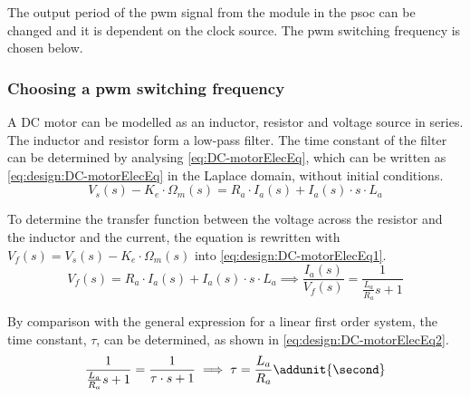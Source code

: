 The output period of the \gls{pwm} signal from the module in the \gls{psoc} can be changed and it is dependent on the clock source. The \gls{pwm} switching frequency is chosen below.

\subsubsection{Choosing a \gls{pwm} switching frequency}
A DC motor can be modelled as an inductor, resistor and voltage source in series. The inductor and resistor form a low-pass filter. The time constant of the filter can be determined by analysing \autoref{eq:DC-motorElecEq}, which can be written as \autoref{eq:design:DC-motorElecEq} in the Laplace domain, without initial conditions.
\begin{equation}
V_{s}(s)-K_{e}\cdot\Omega_{m}(s) = R_{a}\cdot I_a(s) + I_a(s)\cdot s\cdot L_a \label{eq:design:DC-motorElecEq}
\end{equation}
\startexplain
{}
\stopexplain

To determine the transfer function between the voltage across the resistor and the inductor and the current, the equation is rewritten with $V_f(s) = V_{s}(s)-K_{e}\cdot\Omega_{m}(s)$ into \autoref{eq:design:DC-motorElecEq1}.
\begin{equation}
V_f(s)= R_{a}\cdot I_a(s)+ I_a(s)\cdot s\cdot L_a  \implies \frac{I_a(s)}{V_f(s)}=\frac{1}{\frac{L_a}{R_a}s + 1} \label{eq:design:DC-motorElecEq1}
\end{equation}
\startexplain
{}
\stopexplain

By comparison with the general expression for a linear first order system, the time constant, $\tau$, can be determined, as shown in \autoref{eq:design:DC-motorElecEq2}.
\begin{equation}
\frac{1}{\frac{L_a}{R_a}s + 1} = \frac{1}{\tau\cdot s + 1} \implies \tau = \frac{L_a}{R_a} \addunit{\second} \label{eq:design:DC-motorElecEq2}
\end{equation}
\startexplain
{}
\stopexplain

